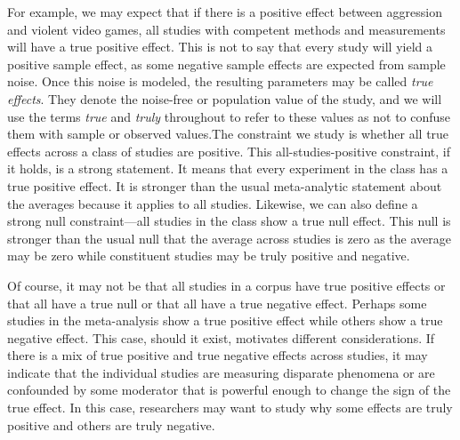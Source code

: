 \documentclass[english,man]{apa6}
\theoremstyle{definition}
\theoremstyle{definition}
\theoremstyle{remark}
\begin{document}
For example, we may expect that if there is a positive effect between
aggression and violent video games, all studies with competent methods
and measurements will have a true positive effect. This is not to say
that every study will yield a positive sample effect, as some negative
sample effects are expected from sample noise. Once this noise is
modeled, the resulting parameters may be called \emph{true effects}.
They denote the noise-free or population value of the study, and we will
use the terms \emph{true} and \emph{truly} throughout to refer to these
values as not to confuse them with sample or observed values.The
constraint we study is whether all true effects across a class of
studies are positive. This all-studies-positive constraint, if it holds,
is a strong statement. It means that every experiment in the class has a
true positive effect. It is stronger than the usual meta-analytic
statement about the averages because it applies to all studies.
Likewise, we can also define a strong null constraint---all studies in
the class show a true null effect. This null is stronger than the usual
null that the average across studies is zero as the average may be zero
while constituent studies may be truly positive and negative.

Of course, it may not be that all studies in a corpus have true positive
effects or that all have a true null or that all have a true negative
effect. Perhaps some studies in the meta-analysis show a true positive
effect while others show a true negative effect. This case, should it
exist, motivates different considerations. If there is a mix of true
positive and true negative effects across studies, it may indicate that
the individual studies are measuring disparate phenomena or are
confounded by some moderator that is powerful enough to change the sign
of the true effect. In this case, researchers may want to study why some
effects are truly positive and others are truly negative.
\end{document}
